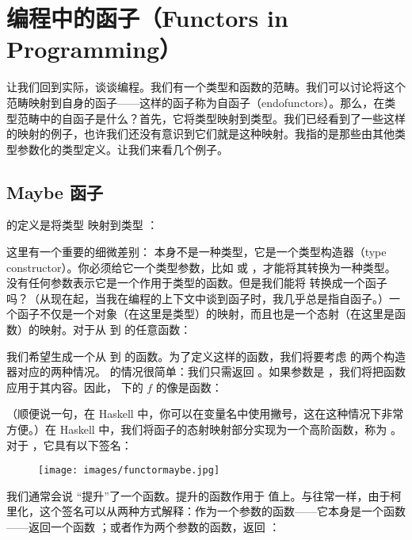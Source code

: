 \section{编程中的函子（Functors in Programming）}

让我们回到实际，谈谈编程。我们有一个类型和函数的范畴。我们可以讨论将这个范畴映射到自身的函子——这样的函子称为自函子（endofunctors）。那么，在类型范畴中的自函子是什么？首先，它将类型映射到类型。我们已经看到了一些这样的映射的例子，也许我们还没有意识到它们就是这种映射。我指的是那些由其他类型参数化的类型定义。让我们来看几个例子。

\subsection{Maybe 函子}

 的定义是将类型  映射到类型 ：

这里有一个重要的细微差别： 本身不是一种类型，它是一个类型构造器（type constructor）。你必须给它一个类型参数，比如  或 ，才能将其转换为一种类型。 没有任何参数表示它是一个作用于类型的函数。但是我们能将  转换成一个函子吗？（从现在起，当我在编程的上下文中谈到函子时，我几乎总是指自函子。）一个函子不仅是一个对象（在这里是类型）的映射，而且也是一个态射（在这里是函数）的映射。对于从  到  的任意函数：

我们希望生成一个从  到  的函数。为了定义这样的函数，我们将要考虑  的两个构造器对应的两种情况。 的情况很简单：我们只需返回 。如果参数是 ，我们将把函数  应用于其内容。因此， 下的 $f$ 的像是函数：

（顺便说一句，在 Haskell 中，你可以在变量名中使用撇号，这在这种情况下非常方便。）在 Haskell 中，我们将函子的态射映射部分实现为一个高阶函数，称为 。对于 ，它具有以下签名：


\begin{figure}[H]
  \centering
  \texttt{[image: images/functormaybe.jpg]}
\end{figure}

\noindent
我们通常会说  “提升”了一个函数。提升的函数作用于  值上。与往常一样，由于柯里化，这个签名可以从两种方式解释：作为一个参数的函数——它本身是一个函数 ——返回一个函数 ；或者作为两个参数的函数，返回 ：

